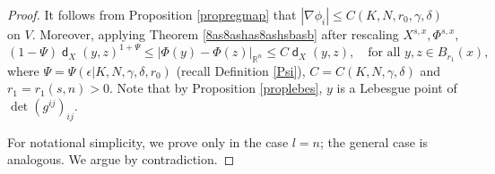 \documentclass[11pt,reqno]{amsart}
\theoremstyle{definition}
\numberwithin{equation}{section}
\DeclareMathOperator{\dist}{\mathsf{d}}
\begin{document}
\begin{proof}
It follows from Proposition \ref{propregmap} that $|\nabla \phi_i| \le C(K, N, r_0, \gamma, \delta)$ on $V$.
Moreover, applying Theorem \ref{8as8ashas8ashsbasb} after rescaling $X^{s, x}, \Phi^{s, x}$, 
\begin{equation}
    (1-\Psi)\dist_X(y,z)^{1+\Psi}\le |\Phi(y)-\Phi(z)|_{\mathbb{R}^n} \le C\dist_X(y, z), \quad \text{for all $y, z \in B_{r_1}(x)$},
\end{equation}
where $\Psi=\Psi(\epsilon | K, N, \gamma, \delta, r_0)$ (recall Definition \ref{Psi}), $C=C(K,N, \gamma, \delta)$ and $r_1=r_1(s, n)>0$.
Note that by Proposition \ref{proplebes}, $y$ is a Lebesgue point of $\det(g^{ij})_{ij}$. 

For notational simplicity, we prove only in the case $l=n$; the general case is analogous. 
We argue by contradiction. 


\end{proof}
\end{document}
